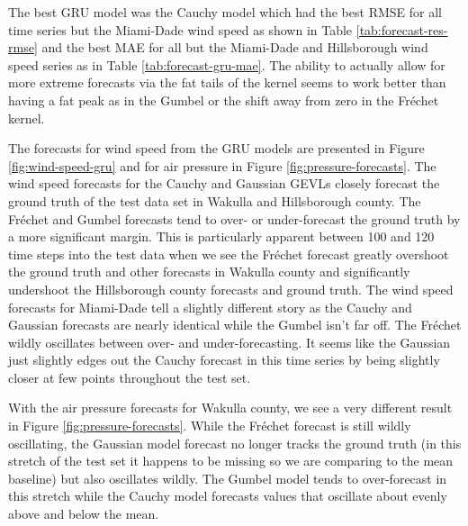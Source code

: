 \documentclass[conference]{IEEEtran}
\begin{document}
The best GRU model was the Cauchy model which had the best RMSE for all time series but the Miami-Dade wind speed as shown in Table \ref{tab:forecast-res-rmse} and the best MAE for all but the Miami-Dade and Hillsborough wind speed series as in Table \ref{tab:forecast-gru-mae}. The ability to actually allow for more extreme forecasts via the fat tails of the kernel seems to work better than having a fat peak as in the Gumbel or the shift away from zero in the Fr\'echet kernel.

The forecasts for wind speed from the GRU models are presented in Figure \ref{fig:wind-speed-gru} and for air pressure in Figure \ref{fig:pressure-forecasts}. The wind speed forecasts for the Cauchy and Gaussian GEVLs closely forecast the ground truth of the test data set in Wakulla and Hillsborough county. The Fr\'echet and Gumbel forecasts tend to over- or under-forecast the ground truth by a more significant margin. This is particularly apparent between 100 and 120 time steps into the test data when we see the Fr\'echet forecast greatly overshoot the ground truth and other forecasts in Wakulla county and significantly undershoot the Hillsborough county forecasts and ground truth. The wind speed forecasts for Miami-Dade tell a slightly different story as the Cauchy and Gaussian forecasts are nearly identical while the Gumbel isn't far off. The Fr\'echet wildly oscillates between over- and under-forecasting. It seems like the Gaussian just slightly edges out the Cauchy forecast in this time series by being slightly closer at few points throughout the test set.

With the air pressure forecasts for Wakulla county, we see a very different result in Figure \ref{fig:pressure-forecasts}. While the Fr\'echet forecast is still wildly oscillating, the Gaussian model  forecast no longer tracks the ground truth (in this stretch of the test set it happens to be missing so we are comparing to the mean baseline) but also oscillates wildly. The Gumbel model tends to over-forecast in this stretch while the Cauchy model forecasts values that oscillate about evenly above and below the mean. 
\end{document}
